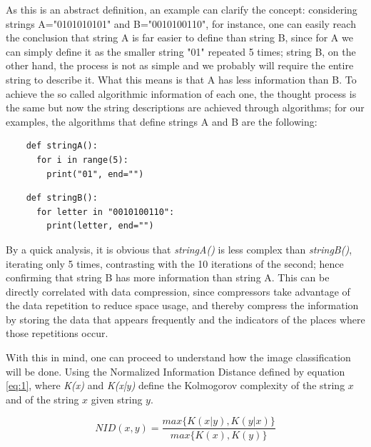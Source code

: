 \documentclass[12pt]{article}
\begin{document}
As this is an abstract definition, an example can clarify the concept: 
considering strings A="0101010101" and B="0010100110", for instance, one can easily reach the conclusion that string A is far easier to define than string B,
since for A we can simply define it as the smaller string "01" repeated 5 times; string B, on the other hand, the process is not as simple and we probably will
require the entire string to describe it.
What this means is that A has less information than B. 
To achieve the so called algorithmic information of each one, the thought process is the same but now the string descriptions are achieved through algorithms;
for our examples, the algorithms that define strings A and B are the following: 

\vspace{0.2in}
\begin{minipage}{0.45\textwidth}
  \begin{verbatim}
    def stringA():
      for i in range(5):
        print("01", end="")
  \end{verbatim}
\end{minipage}
\begin{minipage}{0.45\textwidth}
  \begin{verbatim}
    def stringB():
      for letter in "0010100110":
        print(letter, end="")
  \end{verbatim}
\end{minipage}
\vspace{0.2in}

By a quick analysis, it is obvious that \textit{stringA()} is less complex than \textit{stringB()}, iterating only 5 times, contrasting with the 10 iterations 
of the second; hence confirming that string B has more information than string A. 
This can be directly correlated with data compression, since compressors take advantage of the data repetition to reduce space usage, and thereby compress the 
information by storing the data that appears frequently and the indicators of the places where those repetitions occur.

With this in mind, one can proceed to understand how the image classification will be done. 
Using the Normalized Information Distance defined by equation \ref{eq:1}, where \textit{K(x)} and \textit{K(x|y)} define the Kolmogorov complexity of the 
string $x$ and of the string $x$ given string $y$. 

\begin{equation} \label{eq:1}
  NID(x,y) = \frac{max\{K(x|y),K(y|x)\}}{max\{K(x),K(y)\}}
\end{equation}
\newpage
\end{document}
